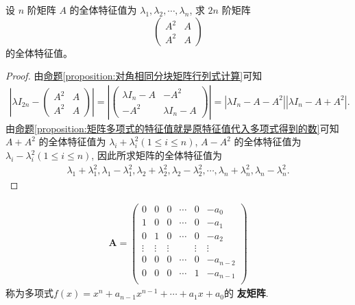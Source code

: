 \documentclass[../../main.tex]{subfiles}%
\begin{document}
\begin{example}
设 $n$ 阶矩阵 $A$ 的全体特征值为 $\lambda_1, \lambda_2, \cdots, \lambda_n$, 求 $2n$ 阶矩阵
\[
\begin{pmatrix}
A^2 & A \\
A^2 & A
\end{pmatrix}
\]
的全体特征值。
\end{example}
\begin{proof}
由\hyperref[proposition:对角相同分块矩阵行列式计算]{命题\ref{proposition:对角相同分块矩阵行列式计算}}可知
\begin{align*}
\left| \lambda I_{2n} - \begin{pmatrix}
A^2 & A \\
A^2 & A
\end{pmatrix} \right| = \left| \begin{pmatrix}
\lambda I_n - A & -A^2 \\
-A^2 & \lambda I_n - A
\end{pmatrix} \right| = |\lambda I_n - A - A^2||\lambda I_n - A + A^2|.
\end{align*}
由\hyperref[proposition:矩阵多项式的特征值就是原特征值代入多项式得到的数]{命题\ref{proposition:矩阵多项式的特征值就是原特征值代入多项式得到的数}}可知 $A + A^2$ 的全体特征值为 $\lambda_i + \lambda_i^2 (1 \leqslant  i \leqslant  n)$, $A - A^2$ 的全体特征值为 $\lambda_i - \lambda_i^2 (1 \leqslant  i \leqslant  n)$, 因此所求矩阵的全体特征值为
\begin{align*}
\lambda_1 + \lambda_1^2, \lambda_1 - \lambda_1^2, \lambda_2 + \lambda_2^2, \lambda_2 - \lambda_2^2, \cdots, \lambda_n + \lambda_n^2, \lambda_n - \lambda_n^2.
\end{align*}
\end{proof}

\begin{definition}[友矩阵]
\begin{align*}
\boldsymbol{A}=\left( \begin{matrix}
0&		0&		0&		\cdots&		0&		-a_0\\
1&		0&		0&		\cdots&		0&		-a_1\\
0&		1&		0&		\cdots&		0&		-a_2\\
\vdots&		\vdots&		\vdots&		&		\vdots&		\vdots\\
0&		0&		0&		\cdots&		0&		-a_{n-2}\\
0&		0&		0&		\cdots&		1&		-a_{n-1}\\
\end{matrix} \right) 
\end{align*}
称为多项式$f\left( x \right) =x^n+a_{n-1}x^{n-1}+\cdots +a_1x+a_0$的
\textbf{友矩阵}.
\end{definition}
\end{document}
